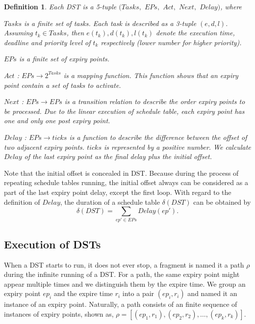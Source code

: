 \documentclass[10pt,conference]{IEEEtran}
\newtheorem{definition}{Definition}
\begin{document}
\begin{definition}
Each DST is a 5-tuple $(Tasks,$ $EPs,$ $Act,$ $Next,$ $Delay)$, where
\begin{compactitem}
  \item $Tasks$ is a finite set of tasks. Each task is described as a 3-tuple $(e,d,l)$. Assuming $t_k\in Tasks$, then $e(t_k),d(t_k),l(t_k)$ denote the execution time, deadline and priority level of $t_k$ respectively (lower number for higher priority).%
  \item $EPs$ is a finite set of expiry points. %
  \item $Act$ : $EPs \rightarrow 2^{Tasks}$ is a mapping function. This function shows that an expiry point contain a set of tasks to activate. %
  \item $Next$ : $ EPs\rightarrow EPs$ is a transition relation to describe the order expiry points to be processed. Due to the linear execution of schedule table, each expiry point has one and only one post expiry point.
  \item $Delay$ : $EPs \rightarrow ticks$ is a function to describe the difference between the offset of two adjacent expiry points. $ticks$ is represented by a positive number. We calculate $Delay$ of the last expiry point as the final delay plus the initial offset.
\end{compactitem}
\end{definition}

Note that the initial offset is concealed in DST. Because during the process of repeating schedule tables running, the initial offset always can be considered as a part of the last expiry point delay, except the first loop. With regard to the definition of $Delay$, the duration of a schedule table $\delta(DST)$ can be obtained by 
\[\delta(DST)=\sum\limits_{ep'\in EPs}Delay(ep').\]

\subsection{Execution of DSTs}
When a DST starts to run, it does not ever stop, a fragment is named it a path $\rho$ during the infinite running of a DST. For a path, the same expiry point might appear multiple times and we distinguish them by the expire time. We group an expiry point $ep_i$ and the expire time $r_i$ into a pair $(ep_i,r_i)$ and named it an instance of an expiry point. Naturally, a path consists of an finite sequence of instances of expiry points, shown as, $\rho=[(ep_1,r_1),(ep_2,r_2),\dots,(ep_k,r_k)]$. 
\end{document}
